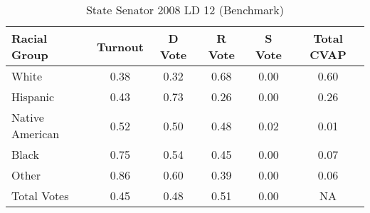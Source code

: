 \begin{table}[htb]
\begin{center}
\caption{State Senator 2008 LD 12 (Benchmark)}
\label{stsen08_cvap_ld_12_benchmark}
\begin{tabular}{lccccc}
  \hline
Racial Group & Turnout & D Vote & R Vote & S Vote & Total CVAP \\ 
  \hline
	White & 0.38  & 0.32  & 0.68  & 0.00  & 0.60 \\
    Hispanic & 0.43  & 0.73  & 0.26  & 0.00  & 0.26 \\
    Native American & 0.52  & 0.50  & 0.48  & 0.02  & 0.01 \\
    Black & 0.75  & 0.54  & 0.45  & 0.00  & 0.07 \\
    Other & 0.86  & 0.60  & 0.39  & 0.00  & 0.06 \\
    Total Votes & 0.45  & 0.48  & 0.51  & 0.00  &  NA \\

   \hline
\end{tabular}
\end{center}
\end{table}